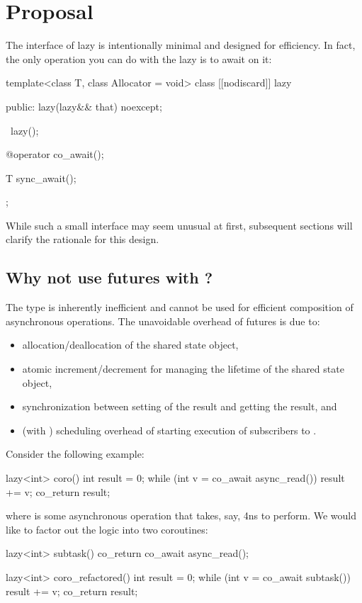 \section{Proposal}

The interface of lazy is intentionally minimal and designed for efficiency.
In fact, the only operation you can do with the lazy is to await on it:

\begin{codeblock}
template<class T, class Allocator = void>
class [[nodiscard]] lazy {
public:
  lazy(lazy&& that) noexcept;

  ~lazy();

  @\unspec@ operator co_await();

  T sync_await();
};
\end{codeblock}

While such a small interface may seem unusual at first,
subsequent sections will clarify the rationale for this design.

\subsection{Why not use futures with ?}

The  type is inherently inefficient and cannot be used for efficient composition of asynchronous operations.
The unavoidable overhead of futures is due to:
\begin{itemize}
\item allocation/deallocation of the shared state object,
\item atomic increment/decrement for managing the lifetime of the shared state object,
\item synchronization between setting of the result and getting the result, and
\item (with ) scheduling overhead of starting execution of subscribers to .
\end{itemize}

Consider the following example:
\begin{codeblock}
lazy<int> coro() {
  int result = 0;
  while (int v = co_await async_read())
    result += v;
  co_return result;
}
\end{codeblock}
where  is some asynchronous operation that takes, say, 4ns to perform.
We would like to factor out the logic into two coroutines:
\begin{codeblock}
lazy<int> subtask() {
  co_return co_await async_read();
}

lazy<int> coro_refactored() {
  int result = 0;
  while (int v = co_await subtask())
    result += v;
  co_return result;
}
\end{codeblock}

